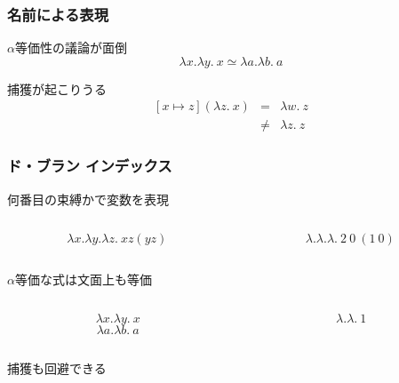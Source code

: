 \documentclass[dvipdfmx,cjk,xcolor=dvipsnames,envcountsect,notheorems,12pt]{beamer}
\theoremstyle{definition}
\begin{document}
\begin{frame}
	\frametitle{名前による表現}
	\LARGE $\alpha$等価性の議論が面倒
	\[ \lambda x.\lambda y.~x \simeq \lambda a.\lambda b.~a \]

	\vfill

	捕獲が起こりうる
	\[ 
		\begin{array}{lcl}
			[x \mapsto z](\lambda z.~x) & = & \lambda w.~z \\
																	& \not = & \lambda z.~z
		\end{array}
	\]
\end{frame}

\begin{frame}
	\frametitle{ド・ブラン インデックス}
	\LARGE
	何番目の束縛かで変数を表現
	\begin{columns}
		\begin{column}{0.5\textwidth}
			\[ \lambda x. \lambda y. \lambda z.~x z (y z) \]
		\end{column}
		\begin{column}{0.5\textwidth}
			\[ \lambda. \lambda. \lambda.~2~0~(1~0) \]
		\end{column}
	\end{columns}

	\vfill

	$\alpha$等価な式は文面上も等価
	\begin{columns}
		\begin{column}{0.5\textwidth}
			\[ \lambda x.\lambda y.~x \]
			\[ \lambda a.\lambda b.~a \]
		\end{column}
		\begin{column}{0.5\textwidth}
			\[ \lambda.\lambda.~1 \]
		\end{column}
	\end{columns}

	\vfill

	捕獲も回避できる
\end{frame}
\end{document}

